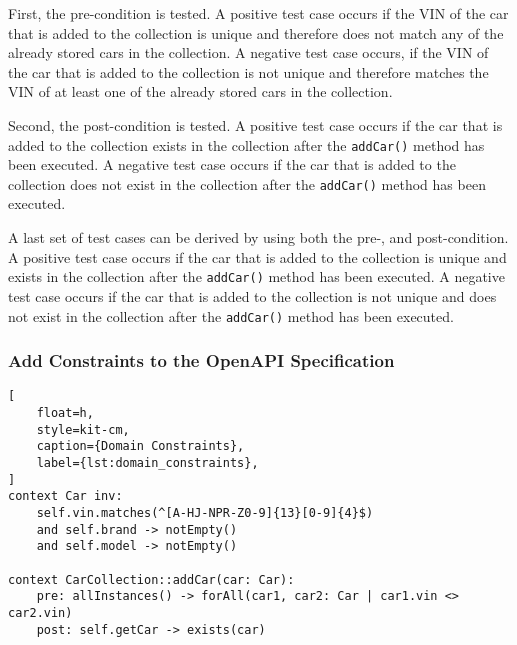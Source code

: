 First, the pre-condition is tested.
A positive test case occurs if the VIN of the car that is added to the collection is unique and therefore does not match any of the already stored cars in the collection.
A negative test case occurs, if the VIN of the car that is added to the collection is not unique and therefore matches the VIN of at least one of the already stored cars in the collection.

Second, the post-condition is tested.
A positive test case occurs if the car that is added to the collection exists in the collection after the \texttt{addCar()} method has been executed.
A negative test case occurs if the car that is added to the collection does not exist in the collection after the \texttt{addCar()} method has been executed.

A last set of test cases can be derived by using both the pre-, and post-condition.
A positive test case occurs if the car that is added to the collection is unique and exists in the collection after the \texttt{addCar()} method has been executed.
A negative test case occurs if the car that is added to the collection is not unique and does not exist in the collection after the \texttt{addCar()} method has been executed.

\subsubsection*{Add Constraints to the OpenAPI Specification}

\begin{lstlisting}[
    float=h,
    style=kit-cm,
    caption={Domain Constraints},
    label={lst:domain_constraints}, 
]
context Car inv:
    self.vin.matches(^[A-HJ-NPR-Z0-9]{13}[0-9]{4}$)
    and self.brand -> notEmpty()
    and self.model -> notEmpty()

context CarCollection::addCar(car: Car):
    pre: allInstances() -> forAll(car1, car2: Car | car1.vin <> car2.vin)
    post: self.getCar -> exists(car)
\end{lstlisting}